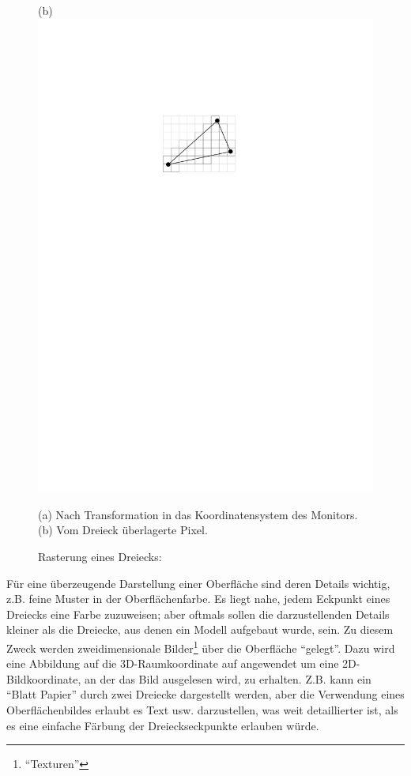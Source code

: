 \documentclass[twoside,a4paper,fleqn,12pt]{book}
\begin{document}
\begin{figure}[h]
  (b) \includegraphics[scale=0.8]{triraster2}
  \caption{Rasterung eines Dreiecks:}
  \small (a) Nach Transformation in das Koordinatensystem des Monitors.\\
  (b) Vom Dreieck überlagerte Pixel.
  \label{fig:triraster}
\end{figure}

Für eine überzeugende Darstellung einer Oberfläche sind deren Details wichtig, z.B. feine Muster in der Oberflächenfarbe.
Es liegt nahe, jedem Eckpunkt eines Dreiecks eine Farbe zuzuweisen; aber oftmals sollen die darzustellenden Details kleiner als die Dreiecke, aus denen
ein Modell aufgebaut wurde, sein.
Zu diesem Zweck werden zweidimensionale Bilder\footnote{"`Texturen"'}
über die Oberfläche "`gelegt"'. Dazu wird eine Abbildung auf die 3D-Raumkoordinate auf angewendet um eine 2D-Bildkoordinate,
an der das Bild ausgelesen wird, zu erhalten. Z.B. kann ein "`Blatt Papier"' durch zwei Dreiecke dargestellt werden, aber die Verwendung
eines Oberflächenbildes erlaubt es Text usw. darzustellen, was weit detaillierter ist, als es eine einfache Färbung der Dreieckseckpunkte erlauben würde.
\end{document}
